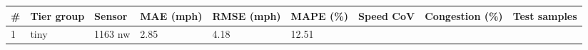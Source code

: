 \documentclass[
  10pt, ]{article}
\begin{document}
\begin{longtable}[]{@{}lllllllll@{}}
\toprule
\begin{minipage}[b]{0.08\columnwidth}\raggedright
\#\strut
\end{minipage} & \begin{minipage}[b]{0.08\columnwidth}\raggedright
Tier group\strut
\end{minipage} & \begin{minipage}[b]{0.08\columnwidth}\raggedright
Sensor\strut
\end{minipage} & \begin{minipage}[b]{0.08\columnwidth}\raggedright
MAE (mph)\strut
\end{minipage} & \begin{minipage}[b]{0.08\columnwidth}\raggedright
RMSE (mph)\strut
\end{minipage} & \begin{minipage}[b]{0.08\columnwidth}\raggedright
MAPE (\%)\strut
\end{minipage} & \begin{minipage}[b]{0.08\columnwidth}\raggedright
Speed CoV\strut
\end{minipage} & \begin{minipage}[b]{0.08\columnwidth}\raggedright
Congestion (\%)\strut
\end{minipage} & \begin{minipage}[b]{0.08\columnwidth}\raggedright
Test samples\strut
\end{minipage}\tabularnewline
\midrule
\endhead
\begin{minipage}[t]{0.08\columnwidth}\raggedright
1\strut
\end{minipage} & \begin{minipage}[t]{0.08\columnwidth}\raggedright
tiny\strut
\end{minipage} & \begin{minipage}[t]{0.08\columnwidth}\raggedright
1163 nw\strut
\end{minipage} & \begin{minipage}[t]{0.08\columnwidth}\raggedright
2.85\strut
\end{minipage} & \begin{minipage}[t]{0.08\columnwidth}\raggedright
4.18\strut
\end{minipage} & \begin{minipage}[t]{0.08\columnwidth}\raggedright
12.51\strut
\end{minipage} & \begin{minipage}[t]{0.08\columnwidth}\raggedright

\end{minipage}
\end{longtable}
\end{document}
